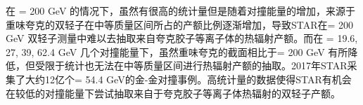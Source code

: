 在 \sNN = 200 GeV 的情况下，虽然有很高的统计量但是随着对撞能量的增加，来源于重味夸克的双轻子在中等质量区间所占的产额比例逐渐增加，导致STAR在\sNN = 200 GeV 双轻子测量中难以去抽取来自夸克胶子等离子体的热辐射产额。而在 \sNN = 19.6, 27, 39, 62.4 GeV 几个对撞能量下，虽然重味夸克的截面相比于\sNN = 200 GeV 有所降低，但受限于统计也无法在中等质量区间进行热辐射产额的抽取。2017年STAR采集了大约12亿个\sNN = 54.4 GeV的金-金对撞事例。高统计量的数据使得STAR有机会在较低的对撞能量下尝试抽取来自于夸克胶子等离子体热辐射的双轻子产额。